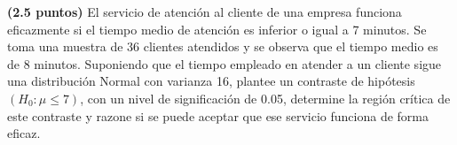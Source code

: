 
\textbf{(2.5 puntos)} El servicio de atención al cliente de una empresa funciona eficazmente si el tiempo medio de atención es inferior o igual a 7 minutos. Se toma una muestra de 36 clientes atendidos y se observa que el tiempo medio es de 8 minutos. Suponiendo que el tiempo empleado en atender a un cliente sigue una distribución Normal con varianza 16, plantee un contraste de hipótesis $(H_0:\mu\leq7)$, con un nivel de significación de 0.05, determine la región crítica de este contraste y razone si se puede aceptar que ese servicio funciona de forma eficaz.
